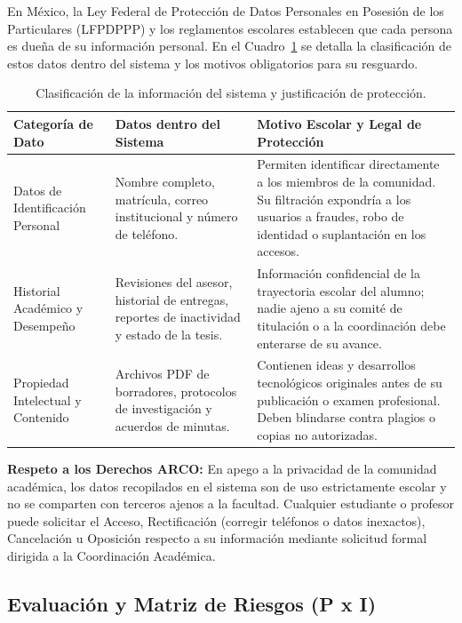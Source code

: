 En México, la Ley Federal de Protección de Datos Personales en Posesión de los Particulares (LFPDPPP) y los reglamentos escolares establecen que cada persona es dueña de su información personal. En el Cuadro~\ref{tab:clasificacion_seguridad} se detalla la clasificación de estos datos dentro del sistema y los motivos obligatorios para su resguardo.

\begin{table}[H]
\centering
\small
\singlespacing
\caption{Clasificación de la información del sistema y justificación de protección.}
\label{tab:clasificacion_seguridad}
\begin{tabular}{p{3.6cm} p{5.0cm} p{6.8cm}}
\toprule
\textbf{Categoría de Dato} & \textbf{Datos dentro del Sistema} & \textbf{Motivo Escolar y Legal de Protección} \\
\midrule
Datos de Identificación Personal & 
Nombre completo, matrícula, correo institucional y número de teléfono. & 
Permiten identificar directamente a los miembros de la comunidad. Su filtración expondría a los usuarios a fraudes, robo de identidad o suplantación en los accesos. \\
\addlinespace
Historial Académico y Desempeño & 
Revisiones del asesor, historial de entregas, reportes de inactividad y estado de la tesis. & 
Información confidencial de la trayectoria escolar del alumno; nadie ajeno a su comité de titulación o a la coordinación debe enterarse de su avance. \\
\addlinespace
Propiedad Intelectual y Contenido & 
Archivos PDF de borradores, protocolos de investigación y acuerdos de minutas. & 
Contienen ideas y desarrollos tecnológicos originales antes de su publicación o examen profesional. Deben blindarse contra plagios o copias no autorizadas. \\
\bottomrule
\end{tabular}
\end{table}

\noindent \textbf{Respeto a los Derechos ARCO:} En apego a la privacidad de la comunidad académica, los datos recopilados en el sistema son de uso estrictamente escolar y no se comparten con terceros ajenos a la facultad. Cualquier estudiante o profesor puede solicitar el Acceso, Rectificación (corregir teléfonos o datos inexactos), Cancelación u Oposición respecto a su información mediante solicitud formal dirigida a la Coordinación Académica.

\subsection{Evaluación y Matriz de Riesgos (P x I)}
\label{subsec:evaluacion_riesgos}

